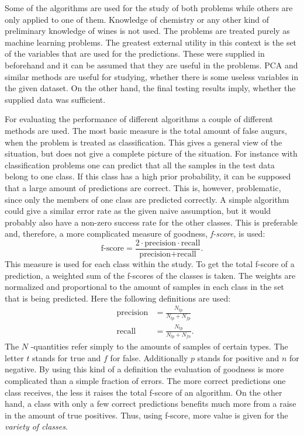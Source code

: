\documentclass[twoside]{article}
\begin{document}
\begin{multicols}{2}
Some of the algorithms are used for the study of both problems while others are only applied to one of them.
Knowledge of chemistry or any other kind of preliminary knowledge of wines is not used. The problems are treated purely as machine learning
problems. The greatest external utility in this context is the set of the variables that are used for the predictions.
These were supplied in beforehand and it can be assumed that they are useful in the problems. PCA and similar methods are useful
for studying, whether there is some useless variables in the given dataset. On the other hand, the final testing results imply, whether the supplied
data was sufficient.

For evaluating the performance of different algorithms a couple of different methods are used. The 
most basic measure is the total amount of false augurs, when the problem is treated as classification.
This gives a general view of the situation, but does not give a complete picture of the situation. For instance
with classification problems one can predict that all the samples in the test data belong to one class. If
this class has a high prior probability, it can be supposed that a large amount of predictions are correct.
This is, however, problematic, since only the members of one class are predicted correctly. A simple algorithm
could give a similar error rate as the given naive assumption, but it would probably also have a non-zero success
rate for the other classes. This is preferable and, therefore, a more complicated measure of goodness, \emph{f-score}, is used:
\begin{equation}
 \text{f-score} = \frac{ 2 \cdot \text{precision} \cdot \text{recall} }{\text{precision} + \text{recall}}.
\end{equation}
This measure is used for each class within the study. To get the total f-score of a prediction, a weighted sum of
the f-scores of the classes is taken. The weights are normalized and proportional to the amount of samples in
each class in the set that is being predicted. Here the following definitions are used:
\begin{eqnarray}
 &\text{precision} & = \frac{N_{tp}}{N_{tp}+N_{fp}} \\
 &\text{recall} & = \frac{N_{tp}}{N_{tp}+N_{fn}}.
\end{eqnarray}
The $N$ -quantities refer simply to the amounts of samples of certain types. The letter $t$ stands for true and $f$ for false.
Additionally $p$ stands for positive and $n$ for negative. By using this kind of a definition the evaluation of goodness
is more complicated than a simple fraction of errors. The more correct predictions one class receives, the less it raises
the total f-score of an algorithm. On the other hand, a class with only a few correct predictions benefits much more from
a raise in the amount of true positives. Thus, using f-score, more value is given for the \emph{variety of classes}.


\end{multicols}
\end{document}
